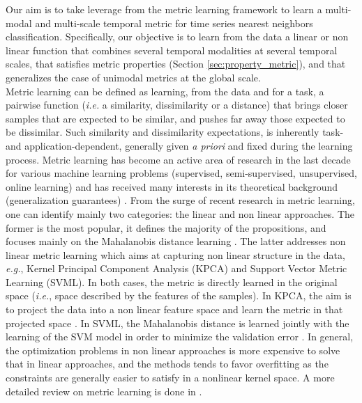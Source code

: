 Our aim is to take leverage from the metric learning framework \cite{Weinberger2009a,Bellet2012} to learn a multi-modal and multi-scale temporal metric for time series nearest neighbors classification. Specifically, our objective is to learn from the data a linear or non linear function that combines several temporal modalities at several temporal scales, that satisfies metric properties (Section \ref{sec:property_metric}), and that generalizes the case of unimodal metrics at the global scale. \\
Metric learning can be defined as learning, from the data and for a task, a pairwise function (\textit{i.e.} a similarity, dissimilarity or a distance) that brings closer samples that are expected to be similar, and pushes far away those expected to be dissimilar. Such similarity and dissimilarity expectations, is inherently task- and application-dependent, generally given \textit{a priori} and fixed during the learning process. Metric learning has become an active area of research in the last decade for various machine learning problems (supervised, semi-supervised, unsupervised, online learning) and has received many interests in its theoretical background (generalization guarantees) \cite{Bellet2013a}. From the surge of recent research in metric learning, one can identify mainly two categories: the linear and non linear approaches. The former is the most popular, it defines the majority of the propositions, and focuses mainly on the Mahalanobis distance learning \cite{Weinberger2009}. The latter addresses non linear metric learning which aims at capturing non linear structure in the data, \textit{e.g.}, Kernel Principal Component Analysis (KPCA) and Support Vector Metric Learning (SVML). In both cases, the metric is directly learned in the original space (\textit{i.e.}, space described by the features of the samples). In KPCA, the aim is to project the data into a non linear feature space and learn the metric in that projected space \cite{Zhang2010,Chatpatanasiri2010}. In SVML, the Mahalanobis distance is learned jointly with the learning of the SVM model in order to minimize the validation error \cite{Xu2012}. In general, the optimization problems in non linear approaches is more expensive to solve that in linear approaches, and the methods tends to favor overfitting as the constraints are generally easier to satisfy in a nonlinear kernel space. A more detailed review on metric learning is done in \cite{Bellet2013a}.\\
